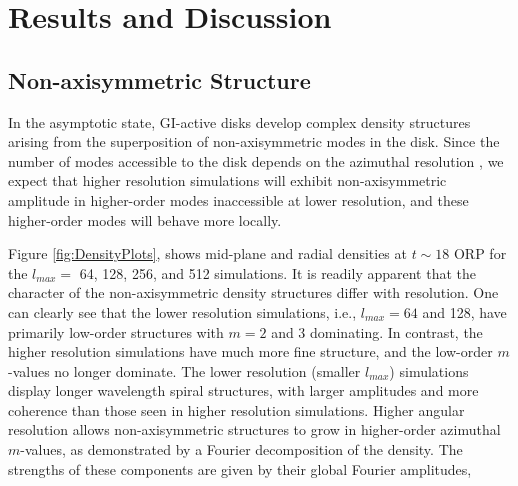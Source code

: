 \documentclass[manuscript]{aastex}
\begin{document}

\section{Results and Discussion}

\subsection{Non-axisymmetric Structure}
	
In the asymptotic state, GI-active disks develop complex density structures arising from the superposition of non-axisymmetric
modes in the disk.  Since the number of modes accessible to the disk depends on the azimuthal resolution \citep{shannon1984}, we expect that higher resolution simulations will exhibit non-axisymmetric amplitude in higher-order modes inaccessible at lower resolution, and these higher-order modes will 
behave more locally. 
	
Figure \ref{fig:DensityPlots}, shows mid-plane and radial densities  at $t \sim 18$ ORP for the $l_{max} =$ 64, 128, 256, and 512 simulations. It is readily apparent that the character of the non-axisymmetric density structures differ with 
resolution. One can clearly see that the lower resolution simulations, i.e., $l_{max} = 64$ and 128, have primarily low-order structures with $m = 2$ and 3 dominating. In contrast, the higher resolution simulations have much more fine structure, 
and the low-order $m$-values no longer dominate.  
The lower resolution (smaller $l_{max}$) simulations display longer wavelength spiral structures, with larger amplitudes and more coherence than those seen in higher resolution simulations. Higher angular resolution allows non-axisymmetric structures to grow in higher-order azimuthal $m$-values, as demonstrated by a Fourier decomposition of the density. The strengths of these components are given by their global Fourier amplitudes,
\end{document}
